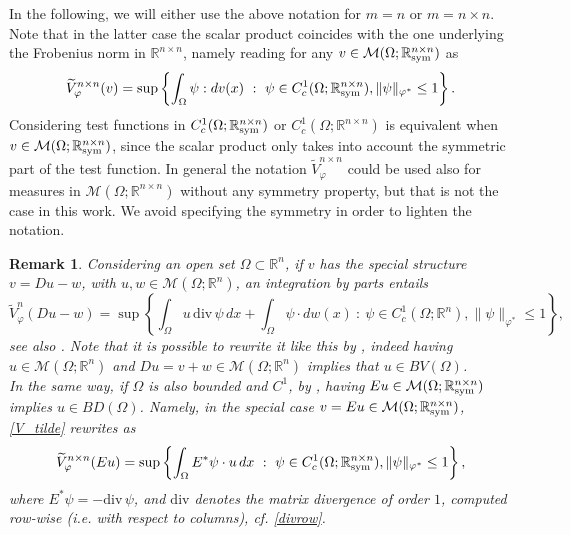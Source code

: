 \documentclass[a4paper,11pt,oneside,notitlepage]{article}
\newtheorem{remark}[theorem]{Remark}
\numberwithin{equation}{section}
\def\R{\mathbb{R}}
\def\M{\mathcal{M}}
\def\sym{{\rm sym}}
\renewcommand{\div}{\mathrm{div}}
\newcommand{\vphi}{\varphi}
\newcommand{\st}{ \ : \ }
\begin{document}
In the following, we will either use the above notation for $m = n$ or $m = n \times n$. Note that in the latter case the scalar product coincides with the one underlying the Frobenius norm in $\R^{n \times n}$, namely reading for any $v \in \M(\Omega;\R^{n\times n}_\sym)$ as 
\begin{equation*}
    \widetilde{V}^{n\times n}_\vphi(v) = \sup \left\{\int_\Omega \psi : dv(x) \st \psi \in C^1_c(\Omega;\R^{n \times n}_\sym), \|\psi\|_{\vphi^*} \le 1 \right\}.
\end{equation*}
Considering test functions in $C^1_c(\Omega;\R^{n \times n}_\sym)$ or $C^1_c(\Omega;\R^{n \times n})$ is equivalent when $v \in \M(\Omega;\R^{n \times n}_\sym)$, since the scalar product only takes into account the symmetric part of the test function. In general the notation $\widetilde{V}^{n\times n}_\vphi$ could be used also for measures in $\M(\Omega;\R^{n \times n})$ without any symmetry property, but that is not the case in this work. We avoid specifying the symmetry in order to lighten the notation.

\begin{remark}
\label{rmk:struttura}
    Considering an open set $\Omega \subset \R^n$, if $v$ has the special structure $v = Du - w$, with $u,w \in \M(\Omega;\R^n)$, an integration by parts entails
    \begin{equation*}
        \widetilde{V}^n_\vphi(Du - w) = \sup \left\{\int_\Omega u \, \div \, \psi \, dx + \int_\Omega \psi \cdot dw(x) \st \psi \in C^1_c(\Omega;\R^n), \|\psi\|_{\vphi^*} \le 1 \right\},
    \end{equation*}
    see also \cite{DFFI}. Note that it is possible to rewrite it like this by \cite[Exercise 3.2]{AFP}, indeed having $u \in \M(\Omega;\R^n)$ and $Du = v + w \in \M(\Omega;\R^n)$ implies that $u \in BV(\Omega)$.
    \\
    In the same way, if $\Omega$ is also bounded and $C^1$, by \cite[Chapter II, Theorem 2.3]{temam}, having $Eu \in \M(\Omega;\R^{n \times n}_\sym)$ implies $u \in BD(\Omega)$. Namely, in the special case $v = Eu \in \M(\Omega;\R^{n\times n}_\sym)$, \eqref{V_tilde} rewrites as
    \begin{equation}
    \label{var_grad_sym}
        \widetilde{V}^{n \times n}_\vphi(E u) = \sup \left\{\int_\Omega E^* \psi \cdot u \, dx \st \psi \in C^1_c(\Omega;\R^{n \times n}_\sym), \|\psi\|_{\vphi^*} \le 1 \right\},
    \end{equation}
    where $E^* \psi = -\div \, \psi$, and $\div$ denotes the matrix divergence of order $1$,  computed  row-wise (i.e. with respect to columns), cf. \eqref{divrow}.
\end{remark}
\end{document}
